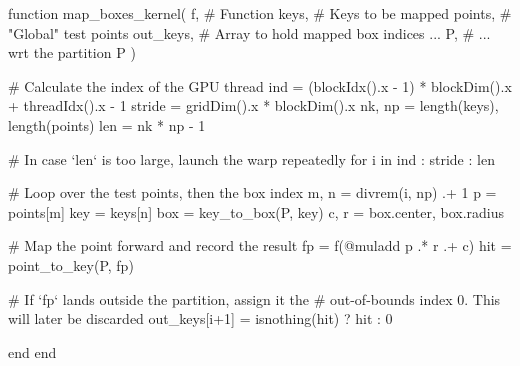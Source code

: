 \begin{jllisting}[float, floatplacement=hb!, language=julia, style=jlcodestyle, label=lst:gpu_kernel, caption=GPU kernel to calculate $f(\mathcal{B})$]
    function map_boxes_kernel(
            f,          # Function
            keys,       # Keys to be mapped
            points,     # "Global" test points
            out_keys,   # Array to hold mapped box indices ...
            P,          # ... wrt the partition P
        )

        # Calculate the index of the GPU thread
        ind = (blockIdx().x - 1) * blockDim().x + threadIdx().x - 1
        stride = gridDim().x * blockDim().x
        nk, np = length(keys), length(points)
        len = nk * np - 1

        # In case `len` is too large, launch the warp repeatedly
        for i in ind : stride : len
        
            # Loop over the test points, then the box index
            m, n = divrem(i, np) .+ 1
            p    = points[m]
            key  = keys[n]
            box  = key_to_box(P, key)
            c, r = box.center, box.radius

            # Map the point forward and record the result
            fp   = f(@muladd p .* r .+ c)
            hit  = point_to_key(P, fp)

            # If `fp` lands outside the partition, assign it the
            # out-of-bounds index 0. This will later be discarded
            out_keys[i+1] = isnothing(hit) ? hit : 0

        end
    end
\end{jllisting}


